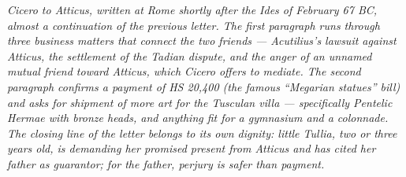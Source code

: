 
\textit{Cicero to Atticus, written at Rome shortly after the
Ides of February 67 BC, almost a continuation of the
previous letter. The first paragraph runs through three
business matters that connect the two friends ---
Acutilius's lawsuit against Atticus, the settlement of the
Tadian dispute, and the anger of an unnamed mutual friend
toward Atticus, which Cicero offers to mediate. The second
paragraph confirms a payment of HS 20,400 (the famous
``Megarian statues'' bill) and asks for shipment of more
art for the Tusculan villa --- specifically Pentelic Hermae
with bronze heads, and anything fit for a gymnasium and a
colonnade. The closing line of the letter belongs to its
own dignity: little Tullia, two or three years old, is
demanding her promised present from Atticus and has cited
her father as guarantor; for the father, perjury is safer
than payment.}
